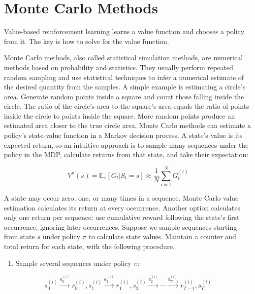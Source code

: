 \setcounter{section}{0}

\hypertarget{monte-carlo-methods}{%
\section{Monte Carlo Methods}\label{monte-carlo-methods}}

Value-based reinforcement learning learns a value function and chooses a policy from it. The key is how to solve for the value function.

Monte Carlo methods, also called statistical simulation methods, are numerical methods based on probability and statistics. They usually perform repeated random sampling and use statistical techniques to infer a numerical estimate of the desired quantity from the samples. A simple example is estimating a circle's area. Generate random points inside a square and count those falling inside the circle. The ratio of the circle's area to the square's area equals the ratio of points inside the circle to points inside the square. More random points produce an estimated area closer to the true circle area. Monte Carlo methods can estimate a policy's state-value function in a Markov decision process. A state's value is its expected return, so an intuitive approach is to sample many sequences under the policy in the MDP, calculate returns from that state, and take their expectation:

\[
V^\pi(s)=\mathbb{E}_\pi[G_t|S_t=s]\approx \frac{1}{N}\sum_{i=1}^{N}G_t^{(i)}
\]

A state may occur zero, one, or many times in a sequence. Monte Carlo value estimation calculates its return at every occurrence. Another option calculates only one return per sequence: use cumulative reward following the state's first occurrence, ignoring later occurrences. Suppose we sample sequences starting from state \(s\) under policy \(\pi\) to calculate state values. Maintain a counter and total return for each state, with the following procedure.

\begin{enumerate}
\def\labelenumi{(\arabic{enumi})}
\tightlist
\item
{}
  Sample several sequences under policy \(\pi\):
\end{enumerate}

\[
s_0^{(i)} \xrightarrow{a_0^{(i)}} r_0^{(i)},s_1^{(i)} \xrightarrow{a_1^{(i)}} r_1^{(i)},s_2^{(i)} \xrightarrow{a_2^{(i)}} \cdots \xrightarrow{a_{T-1}^{(i)}} r_{T-1}^{(i)},s_T^{(i)}
\]

